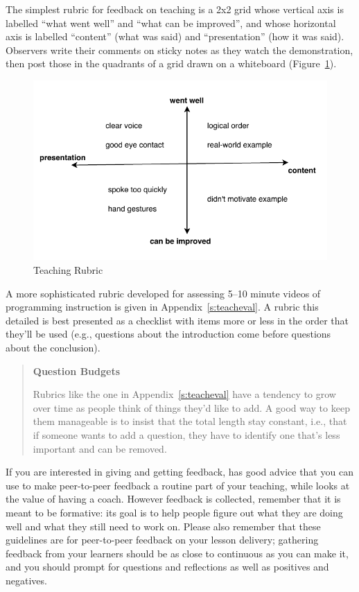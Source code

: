 The simplest rubric for feedback on teaching is a 2x2 grid whose
vertical axis is labelled ``what went well'' and ``what can be improved'',
and whose horizontal axis is labelled ``content'' (what was said) and
``presentation'' (how it was said). Observers write their comments on
sticky notes as they watch the demonstration, then post those in the
quadrants of a grid drawn on a whiteboard
(Figure~\ref{f:performance-rubric}).

\begin{figure}
\centering
\includegraphics{../../figures/2x2-rubric.pdf}
\caption{Teaching Rubric}
\label{f:performance-rubric}
\end{figure}

A more sophisticated rubric developed for assessing 5--10 minute videos
of programming instruction is given in Appendix~\ref{s:teacheval}. A
rubric this detailed is best presented as a checklist with items more or
less in the order that they'll be used (e.g., questions about the
introduction come before questions about the conclusion).

\begin{quote}\setlength{\parindent}{0pt}
\textbf{Question Budgets}

Rubrics like the one in Appendix~\ref{s:teacheval} have a tendency to
grow over time as people think of things they'd like to add. A good
way to keep them manageable is to insist that the total length stay
constant, i.e., that if someone wants to add a question, they have to
identify one that's less important and can be removed.
\end{quote}

If you are interested in giving and getting feedback, \cite{Gorm2014}
has good advice that you can use to make peer-to-peer feedback a routine
part of your teaching, while \cite{Gawa2011} looks at the value of
having a coach. However feedback is collected, remember that it is meant
to be formative: its goal is to help people figure out what they are
doing well and what they still need to work on. Please also remember
that these guidelines are for peer-to-peer feedback on your lesson
delivery; gathering feedback from your learners should be as close to
continuous as you can make it, and you should prompt for questions and
reflections as well as positives and negatives.

